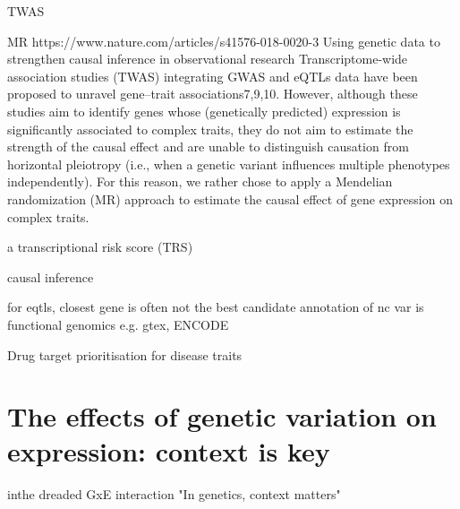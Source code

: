 \begin{outline}
    \2 TWAS

    \2 MR
    https://www.nature.com/articles/s41576-018-0020-3
    Using genetic data to strengthen causal inference in observational research
    Transcriptome-wide association studies (TWAS) integrating GWAS and eQTLs data have been proposed to unravel gene–trait associations7,9,10. However, although these studies aim to identify genes whose (genetically predicted) expression is significantly associated to complex traits, they do not aim to estimate the strength of the causal effect and are unable to distinguish causation from horizontal pleiotropy (i.e., when a genetic variant influences multiple phenotypes independently). For this reason, we rather chose to apply a Mendelian randomization (MR) approach to estimate the causal effect of gene expression on complex traits.

    \2 a transcriptional risk score (TRS)

    \2 causal inference

\1 for eqtls, closest gene is often not the best candidate
    \2 annotation of nc var is functional genomics
        \3 e.g. gtex, ENCODE

    \2 Drug target prioritisation for disease traits



\section{The effects of genetic variation on expression: context is key}


\1 inthe dreaded GxE interaction
    \2 "In genetics, context matters"


\end{outline}
